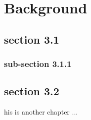 \chapter{Background}
\minitoc
\section{section 3.1}
\subsection{sub-section 3.1.1}
\section{section 3.2}
his is another chapter ...